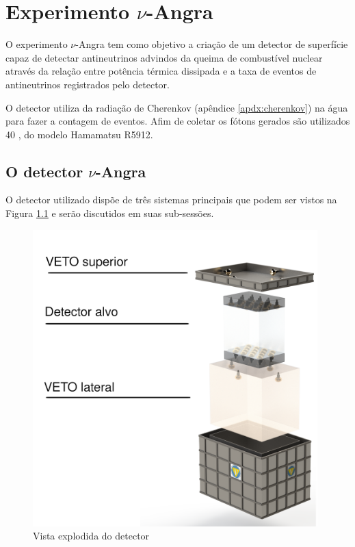 \chapter{Experimento $\nu$-Angra}\label{cap:experimento}
\vspace{-2cm}

O experimento $\nu$-Angra tem como objetivo a criação de um detector de superfície capaz de detectar antineutrinos advindos da queima de combustível nuclear através da relação entre potência térmica dissipada e a taxa de eventos de antineutrinos registrados pelo detector.

O detector utiliza da radiação de Cherenkov (apêndice \ref{apdx:cherenkov}) na água para fazer a contagem de eventos. Afim de coletar os fótons gerados são utilizados 40 , do modelo Hamamatsu R5912.



\section{O detector $\nu$-Angra}

O detector utilizado dispõe de três sistemas principais que podem ser vistos na Figura \ref{fig:detector} e serão discutidos em suas sub-sessões.

\begin{figure}[H]
    \centering
    \includegraphics[width=11cm]{textuais/experimento/figuras/detector.png}
    \caption{Vista explodida do detector}
    \label{fig:detector}
\end{figure}

